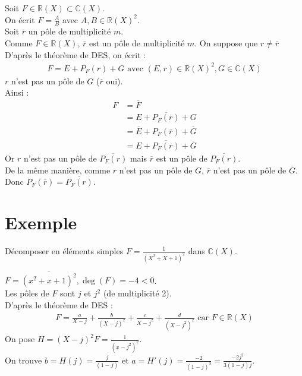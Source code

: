 \documentclass[../main.tex]{subfiles}
\begin{document}
\noindent Soit $F \in \mathbb{R}(X) \subset \mathbb{C}(X)$. \\
On écrit $F = \frac{A}{B}$ avec $A, B \in \mathbb{R}(X)^2$. \\
Soit $r$ un pôle de multiplicité $m$. \\
Comme $F \in \mathbb{R}(X)$, $\overline{r}$ est un pôle de multiplicité $m$. On suppose que $r \neq \overline{r}$ \\
D'après le théorème de DES, on écrit : 
\begin{align*}
    F = E + P_F(r) + G \text{ avec } (E, r) \in \mathbb{R}(X)^2, G \in \mathbb{C}(X)
\end{align*}
$r$ n'est pas un pôle de $G$ ($\overline{r}$ oui). \\
Ainsi : 
\begin{align*}
    F &= \overline{F} \\
    &= \overline{E + P_F(r) + G} \\
    &= \overline{E} + P_F(\overline{r}) + \overline{G} \\
    &= E + \overline{P_F(r)} + \overline{G}
\end{align*}
Or $r$ n'est pas un pôle de $\overline{P_F(r)}$ mais $\overline{r}$ est un pôle de $\overline{P_F(r)}$. \\
De la même manière, comme $r$ n'est pas un pôle de $G$, $\overline{r}$ n'est pas un pôle de $\overline{G}$. \\
Donc $P_F(\overline{r}) = \overline{P_F(r)}$.

\section{Exemple}
\begin{tcolorbox}[title=Exemple 17.45, title filled=false, colframe=darkgreen, colback=darkgreen!10!white]
    Décomposer en éléments simples $F = \frac{1}{(X^2 + X + 1)^2}$ dans $\mathbb{C}(X)$. 
\end{tcolorbox}

\noindent $F = \overline{(x^2 + x + 1)^2}, \deg(F) = -4 < 0$. \\
Les pôles de $F$ sont $j$ et $j^2$ (de multiplicité 2). \\
D'après le théorème de DES :
\begin{align*}
    F = \frac{a}{X - j} + \frac{b}{(X - j)^2} + \frac{c}{X - j^2} + \frac{d}{(X - j^2)^2} \text{ car } F \in \mathbb{R}(X)
\end{align*}
On pose $H = (X -j)^2 F = \frac{1}{(x - j^2)^2}$. \\
On trouve $b = H(j) = \frac{j}{(1-j)}$ et $a = H'(j) = \frac{-2}{(1-j)^3} = \frac{-2j^2}{3(1-j)j}$. \\
\end{document}
